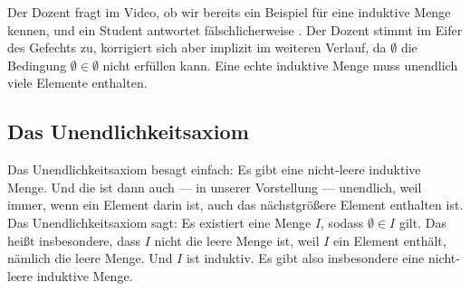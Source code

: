 \begin{math-stroke}


\begin{ai-note}
Der Dozent fragt im Video, ob wir bereits ein Beispiel für eine induktive Menge kennen, und ein Student antwortet fälschlicherweise . Der Dozent stimmt im Eifer des Gefechts zu, korrigiert sich aber implizit im weiteren Verlauf, da $\emptyset$ die Bedingung $\emptyset \in \emptyset$ nicht erfüllen kann. Eine echte induktive Menge muss unendlich viele Elemente enthalten.
\end{ai-note}
\end{math-stroke}

\subsection{Das Unendlichkeitsaxiom}
\begin{spoken-clean}[00:22:54 - 00:25:03]
Das Unendlichkeitsaxiom besagt einfach: Es gibt eine nicht-leere induktive Menge. Und die ist dann auch --- in unserer Vorstellung --- unendlich, weil immer, wenn ein Element darin ist, auch das nächstgrößere Element enthalten ist. Das Unendlichkeitsaxiom sagt: Es existiert eine Menge $I$, sodass $\emptyset \in I$ gilt. Das heißt insbesondere, dass $I$ nicht die leere Menge ist, weil $I$ ein Element enthält, nämlich die leere Menge. Und $I$ ist induktiv. Es gibt also insbesondere eine nicht-leere induktive Menge.
\end{spoken-clean}

